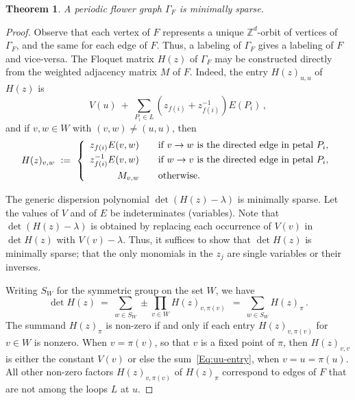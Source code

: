 \documentclass[12pt]{amsart}
\newtheorem{Theorem}{Theorem}[section]
\theoremstyle{remark}
\newcommand{\ZZ}{{\mathbb Z}}
\begin{document}
\begin{Theorem}\label{Th:FlowerGraphs}
  A periodic flower graph $\Gamma_F$ is minimally sparse.
\end{Theorem}
\begin{proof}
  Observe that each vertex of $F$ represents a unique $\ZZ^d$-orbit of vertices of $\Gamma_F$, and the same for each
  edge of $F$. 
  Thus, a labeling of $\Gamma_F$ gives a labeling of $F$ and vice-versa.
  The Floquet matrix $H(z)$ of $\Gamma_F$ may be constructed directly
  from the weighted adjacency matrix $M$ of $F$.
  Indeed, the entry $H(z)_{u,u}$ of $H(z)$ is
  \begin{equation}\label{Eq:uu-entry}
     V(u)\ +\ \sum_{P_i\in L} \left(z_{f(i)}+z_{f(i)}^{-1}\right)E(P_i)\,,
  \end{equation}
  and if $v,w\in W$ with $(v,w)\neq (u,u)$, then 
  \begin{equation}\label{Eq:H_Defn}
    H(z)_{v,w}\ \vcentcolon=\ \left\{
    \begin{array}{rcl}
      z_{f(i)}E(v,w)&&\mbox{if } v\to w\mbox{ is the directed edge in petal }P_i,\vspace{3pt}\\
      z_{f(i)}^{-1}E(v,w)&&\mbox{if } w\to v\mbox{ is the directed edge in petal }P_i,\vspace{3pt}\\
      M_{v,w}&&\mbox{otherwise.}
    \end{array}\right.
  \end{equation}

  The generic dispersion polynomial $\det(H(z){-}\lambda)$ is minimally sparse.
  Let the values of $V$ and of $E$ be indeterminates (variables).
  Note that $\det(H(z){-}\lambda)$  is obtained  by replacing each occurrence of $V(v)$ in $\det H(z)$ with $V(v){-}\lambda$.
  Thus, it suffices to show that $\det H(z)$ is minimally sparse; that the only monomials in the $z_j$ are
  single variables or their inverses.

  Writing $S_W$ for the symmetric group on the set $W$, we have
  \[
     \det H(z)\ =\ \sum_{w\in S_W} \pm \prod_{v\in W} H(z)_{v,\pi(v)}
      \ \ =\ \sum_{w\in S_W}  H(z)_\pi\,.
  \]
  The summand $H(z)_\pi$ is non-zero if and only if each entry $H(z)_{v,\pi(v)}$ for $v\in W$ is nonzero.
  When $v=\pi(v)$, so that $v$ is a fixed point of $\pi$, then $H(z)_{v,v}$ is either the constant $V(v)$ or
  else the sum~\eqref{Eq:uu-entry}, when $v=u=\pi(u)$.
  All other non-zero factors $H(z)_{v,\pi(v)}$ of $H(z)_\pi$ correspond to edges of $F$ that are not among the loops
  $L$ at $u$. 


\end{proof}
\end{document}
